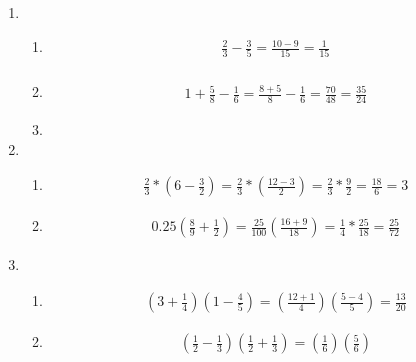 \documentclass{article}
\begin{document}
\begin{enumerate}
	\item
	      \begin{enumerate}
		      \item
		            \begin{align*}
			            \frac{2}{3} - \frac{3}{5} = \frac{10 - 9}{15}
			            = \frac{1}{15}
		            \end{align*}
		            \begin{align*}
		            \end{align*}
		      \item
		            \begin{align*}
			            1 + \frac{5}{8} - \frac{1}{6} = \frac{8 + 5}{8} - \frac{1}{6}
			            = \frac{70}{48}  = \frac{35}{24}
		            \end{align*}
		      \item
	      \end{enumerate}
	\item
	      \begin{enumerate}
		      \item
		            \begin{align*}
			            \frac{2}{3} * \left(6 - \frac{3}{2}\right) = \frac{2}{3} * \left( \frac{12 - 3}{2} \right)
			            = \frac{2}{3} * \frac{9}{2}
			            = \frac{18}{6}  = 3
		            \end{align*}
		      \item
		            \begin{align*}
			            0.25\left(\frac{8}{9} + \frac{1}{2}\right) = \frac{25}{100}\left(\frac{16 + 9}{18}\right)
			            = \frac{1}{4} * \frac{25}{18}  = \frac{25}{72}
		            \end{align*}
	      \end{enumerate}
	\item
	      \begin{enumerate}
		      \item
		            \begin{align*}
			            \left(3 + \frac{1}{4}\right)\left(1 - \frac{4}{5}\right)
			            = \left(\frac{12 + 1}{4}\right)\left(\frac{5 - 4}{5}\right)
			            = \frac{13}{20}\end{align*}
		      \item
		            \begin{align*}
			            \left(\frac{1}{2} - \frac{1}{3}\right)\left(\frac{1}{2} + \frac{1}{3}\right)
			            = \left(\frac{1}{6}\right)\left(\frac{5}{6}\right)

\end{align*}
\end{enumerate}
\end{enumerate}
\end{document}
